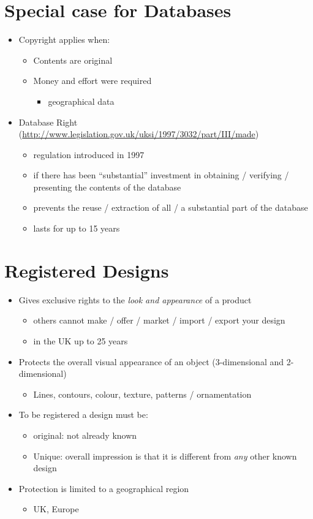 \documentclass{article}
\begin{document}
\section{Special case for Databases}
\begin{itemize}
\item Copyright applies when: 
\begin{itemize}
\item Contents are original
\item Money and effort were required 
\begin{itemize}
\item geographical data
\end{itemize}
\end{itemize}
\item Database Right (\url{http://www.legislation.gov.uk/uksi/1997/3032/part/III/made})
\begin{itemize}
\item regulation introduced in 1997
\item if there has been ``substantial'' investment in obtaining / verifying / presenting the contents of the database
\item prevents the reuse / extraction of all / a substantial part of the database
\item lasts for up to 15 years
\end{itemize}
\end{itemize}



\section{Registered Designs}
\begin{itemize}
\item Gives exclusive rights to the \emph{look and appearance} of a product
\begin{itemize}
\item others cannot make / offer / market / import / export your design
\item in the UK up to 25 years
\end{itemize}
\item Protects the overall visual appearance of an object (3-dimensional and 2-dimensional)
\begin{itemize}
\item Lines, contours, colour, texture, patterns / ornamentation
\end{itemize}
\item To be registered a design must be:
\begin{itemize}
\item original: not already known
\item Unique: overall impression is that it is different from \emph{any} other known design
\end{itemize}
\item Protection is limited to a geographical region
\begin{itemize}
\item UK, Europe
\end{itemize}
\end{itemize}
\end{document}

